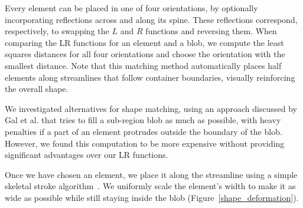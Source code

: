 Every element can be placed in one of four orientations, by optionally 
incorporating reflections across and along its spine.  These reflections
correspond, respectively, to swapping the $L$ and $R$ functions and reversing
them.  When comparing the LR functions for an element and a blob, we compute
the least squares distances for all four orientations and choose the 
orientation with the smallest distance.  Note that this matching method
automatically places half elements along streamlines that follow container
boundaries, visually reinforcing the overall shape.

We investigated alternatives for shape matching, using an approach
discussed by Gal et al. \cite{Gal2007B} that tries to fill a sub-region
blob as much as possible, with heavy penalties if a part of an
element protrudes outside the boundary of the blob. However, we found
this computation to be more expensive without providing significant
advantages over our LR functions.

Once we have chosen an element, we place it along the streamline using a
simple skeletal stroke algorithm~\cite{Hsu1993}. We uniformly scale the element's width
to make it as wide as possible while still staying inside the blob
(Figure~\ref{shape_deformation}).

